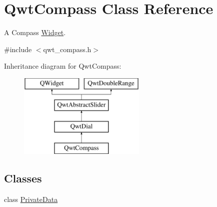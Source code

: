 \hypertarget{class_qwt_compass}{\section{Qwt\-Compass Class Reference}
\label{class_qwt_compass}
}


A Compass \hyperlink{class_widget}{Widget}.  




{\ttfamily \#include $<$qwt\-\_\-compass.\-h$>$}

Inheritance diagram for Qwt\-Compass\-:\begin{figure}[H]
\begin{center}
\leavevmode
\includegraphics[height=4.000000cm]{class_qwt_compass}
\end{center}
\end{figure}
\subsection*{Classes}
\begin{DoxyCompactItemize}
\item 
class \hyperlink{class_qwt_compass_1_1_private_data}{Private\-Data}
\end{DoxyCompactItemize}
